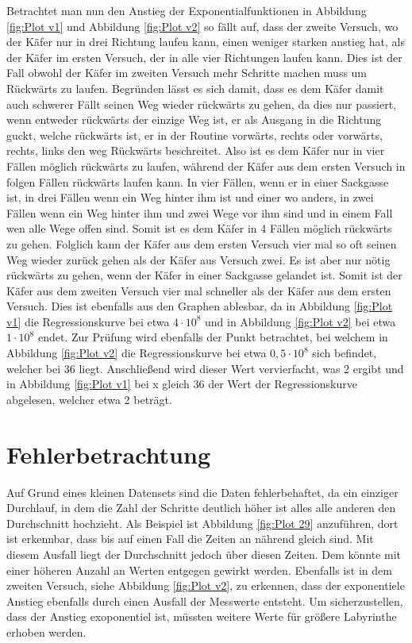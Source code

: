 \documentclass[12pt, a4paper, titlepage]{article}
\begin{document}
\bigskip

Betrachtet man nun den Anstieg der Exponentialfunktionen in Abbildung \ref{fig:Plot v1} und Abbildung \ref{fig:Plot v2} so fällt auf, dass der zweite Versuch, wo der Käfer nur in drei Richtung laufen kann, einen weniger starken anstieg hat, als der Käfer im ersten Versuch, der in alle vier Richtungen laufen kann.
Dies ist der Fall obwohl der Käfer im zweiten Versuch mehr Schritte machen muss um Rückwärts zu laufen.
Begründen lässt es sich damit, dass es dem Käfer damit auch schwerer Fällt seinen Weg wieder rückwärts zu gehen, da dies nur passiert, wenn entweder rückwärts der einzige Weg ist, er als Ausgang in die Richtung guckt, welche rückwärts ist, er in der Routine vorwärts, rechts oder vorwärts, rechts, links den weg Rückwärts beschreitet.
Also ist es dem Käfer nur in vier Fällen möglich rückwärts zu laufen, während der Käfer aus dem ersten Versuch in folgen Fällen rückwärts laufen kann.
In vier Fällen, wenn er in einer Sackgasse ist, in drei Fällen wenn ein Weg hinter ihm ist und einer wo anders, in zwei Fällen wenn ein Weg hinter ihm und zwei Wege vor ihm sind und in einem Fall wen alle Wege offen sind.
Somit ist es dem Käfer in 4 Fällen möglich rückwärts zu gehen.
Folglich kann der Käfer aus dem ersten Versuch vier mal so oft seinen Weg wieder zurück gehen als der Käfer aus Versuch zwei.
Es ist aber nur nötig rückwärts zu gehen, wenn der Käfer in einer Sackgasse gelandet ist.
Somit ist der Käfer aus dem zweiten Versuch vier mal schneller als der Käfer aus dem ersten Versuch.
Dies ist ebenfalls aus den Graphen ablesbar, da in Abbildung \ref{fig:Plot v1} die Regressionskurve bei etwa $4 \cdot 10^8$ und in Abbildung \ref{fig:Plot v2} bei etwa $1 \cdot 10^8$ endet.
Zur Prüfung wird ebenfalls der Punkt betrachtet, bei welchem in Abbildung \ref{fig:Plot v2} die Regressionskurve bei etwa $0,5 \cdot 10^8$ sich befindet, welcher bei 36 liegt.
Anschließend wird dieser Wert vervierfacht, was 2 ergibt und in Abbildung \ref{fig:Plot v1} bei x gleich 36 der Wert der Regressionskurve abgelesen, welcher etwa 2 beträgt.

\section{Fehlerbetrachtung}

Auf Grund eines kleinen Datensets sind die Daten fehlerbehaftet, da ein einziger Durchlauf, in dem die Zahl der Schritte deutlich höher ist alles alle anderen den Durchschnitt hochzieht.
Als Beispiel ist Abbildung \ref{fig:Plot 29} anzuführen, dort ist erkennbar, dass bis auf einen Fall die Zeiten an nährend gleich sind.
Mit diesem Ausfall liegt der Durchschnitt jedoch über diesen Zeiten.
Dem könnte mit einer höheren Anzahl an Werten entgegen gewirkt werden.
Ebenfalls ist in dem zweiten Versuch, siehe Abbildung \ref{fig:Plot v2}, zu erkennen, dass der exponentiele Anstieg ebenfalls durch einen Ausfall der Messwerte entsteht.
Um sicherzustellen, dass der Anstieg exoponentiel ist, müssten weitere Werte für größere Labyrinthe erhoben werden.
\end{document}
